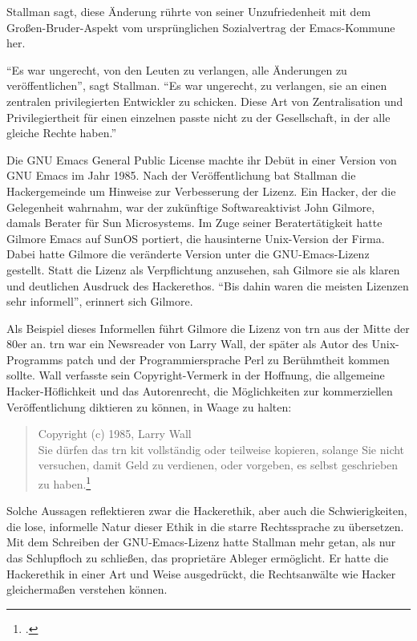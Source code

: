 Stallman sagt, diese Änderung rührte von seiner Unzufriedenheit mit dem Großen-Bruder-Aspekt vom ursprünglichen Sozialvertrag der Emacs-Kommune her.

"`Es war ungerecht, von den Leuten zu verlangen, alle Änderungen zu veröffentlichen"', sagt Stallman. "`Es war ungerecht, zu verlangen, sie an einen zentralen privilegierten Entwickler zu schicken. Diese Art von Zentralisation und Privilegiertheit für einen einzelnen passte nicht zu der Gesellschaft, in der alle gleiche Rechte haben."'

Die GNU Emacs General Public License machte ihr Debüt in einer Version von GNU Emacs im Jahr 1985. Nach der Veröffentlichung bat Stallman die Hackergemeinde um Hinweise zur Verbesserung der Lizenz. Ein Hacker, der die Gelegenheit wahrnahm, war der zukünftige Softwareaktivist John Gilmore, damals Berater für Sun Microsystems. Im Zuge seiner Beratertätigkeit hatte Gilmore Emacs auf SunOS portiert, die hausinterne Unix-Version der Firma. Dabei hatte Gilmore die veränderte Version unter die GNU-Emacs-Lizenz gestellt. Statt die Lizenz als Verpflichtung anzusehen, sah Gilmore sie als klaren und deutlichen Ausdruck des Hackerethos. "`Bis dahin waren die meisten Lizenzen sehr informell"', erinnert sich Gilmore.

Als Beispiel dieses Informellen führt Gilmore die Lizenz von trn aus der Mitte der 80er an. trn war ein Newsreader von Larry Wall, der später als Autor des Unix-Programms patch und der Programmiersprache Perl zu Berühmtheit kommen sollte. Wall verfasste sein Copyright-Vermerk in der Hoffnung, die allgemeine Hacker-Höflichkeit und das Autorenrecht, die Möglichkeiten zur kommerziellen Veröffentlichung diktieren zu können, in Waage zu halten:

\begin{quote}
Copyright (c) 1985, Larry Wall\\
Sie dürfen das trn kit vollständig oder teilweise kopieren, solange Sie nicht versuchen, damit Geld zu verdienen, oder vorgeben, es selbst geschrieben zu haben.\footcite[Vgl.][(neuere Version)]{trnread}
\end{quote}

Solche Aussagen reflektieren zwar die Hackerethik, aber auch die Schwierigkeiten, die lose, informelle Natur dieser Ethik in die starre Rechtssprache zu übersetzen. Mit dem Schreiben der GNU-Emacs-Lizenz hatte Stallman mehr getan, als nur das Schlupfloch zu schließen, das proprietäre Ableger ermöglicht. Er hatte die Hackerethik in einer Art und Weise ausgedrückt, die Rechtsanwälte wie Hacker gleichermaßen verstehen können.

